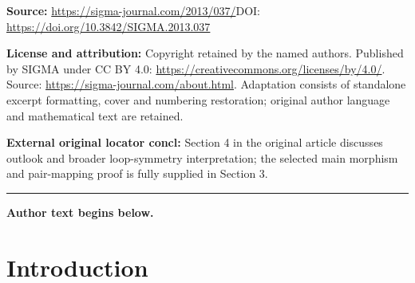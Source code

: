 \documentclass[11pt]{article}
\begin{document}
\noindent\textbf{Source:} \url{https://sigma-journal.com/2013/037/}\quad DOI: \url{https://doi.org/10.3842/SIGMA.2013.037}\par
\noindent\textbf{License and attribution:} Copyright retained by the named authors. Published by SIGMA under CC BY 4.0: \url{https://creativecommons.org/licenses/by/4.0/}. Source: \url{https://sigma-journal.com/about.html}. Adaptation consists of standalone excerpt formatting, cover and numbering restoration; original author language and mathematical text are retained.\par
\noindent\textbf{External original locator concl:} Section 4 in the original article discusses outlook and broader loop-symmetry interpretation; the selected main morphism and pair-mapping proof is fully supplied in Section 3.\par
\medskip\hrule\medskip\noindent\textbf{Author text begins below.}\par
\setcounter{section}{0}
\setcounter{subsection}{0}
\setcounter{subsubsection}{0}
\setcounter{equation}{0}
\section{Introduction}
\end{document}
